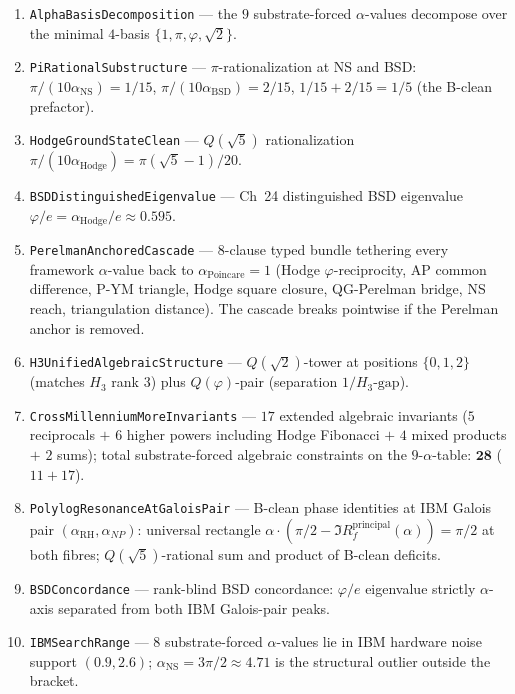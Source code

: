 \documentclass[11pt,a4paper]{article}
\theoremstyle{plain}
\theoremstyle{definition}
\theoremstyle{remark}
\newcommand{\aPo}{\alpha_{\mathrm{Poincare}}}
\newcommand{\aNP}{\alpha_{NP}}
\newcommand{\aRH}{\alpha_{\mathrm{RH}}}
\newcommand{\aNS}{\alpha_{\mathrm{NS}}}
\newcommand{\aBSD}{\alpha_{\mathrm{BSD}}}
\newcommand{\aHodge}{\alpha_{\mathrm{Hodge}}}
\newcommand{\code}[1]{\texttt{#1}}
\begin{document}
\begin{enumerate}[label=\textbf{S\arabic*}]
\item \code{AlphaBasisDecomposition} --- the $9$ substrate-forced
$\alpha$-values decompose over the minimal $4$-basis
$\{1, \pi, \varphi, \sqrt{2}\}$.

\item \code{PiRationalSubstructure} ---
$\pi$-rationalization at NS and BSD:
$\pi/(10 \aNS) = 1/15$, $\pi/(10 \aBSD) = 2/15$,
$1/15 + 2/15 = 1/5$ (the B-clean prefactor).

\item \code{HodgeGroundStateClean} ---
$Q(\sqrt{5})$ rationalization
$\pi/(10 \aHodge) = \pi(\sqrt{5}-1)/20$.

\item \code{BSDDistinguishedEigenvalue} --- Ch~24 distinguished
BSD eigenvalue $\varphi/e = \aHodge/e \approx 0.595$.

\item \code{PerelmanAnchoredCascade} --- $8$-clause typed
bundle tethering every framework $\alpha$-value back to
$\aPo = 1$ (Hodge $\varphi$-reciprocity, AP common difference,
P-YM triangle, Hodge square closure, QG-Perelman bridge, NS
reach, triangulation distance). The cascade breaks pointwise
if the Perelman anchor is removed.

\item \code{H3UnifiedAlgebraicStructure} ---
$Q(\sqrt{2})$-tower at positions $\{0, 1, 2\}$ (matches $H_{3}$
rank $3$) plus $Q(\varphi)$-pair (separation $1/H_{3}\text{-gap}$).

\item \code{CrossMillenniumMoreInvariants} --- $17$ extended
algebraic invariants ($5$ reciprocals $+$ $6$ higher powers
including Hodge Fibonacci $+$ $4$ mixed products $+$ $2$ sums);
total substrate-forced algebraic constraints on the $9$-$\alpha$-table:
$\boldsymbol{28}$ ($11 + 17$).

\item \code{PolylogResonanceAtGaloisPair} --- B-clean phase
identities at IBM Galois pair $(\aRH, \aNP)$: universal
rectangle $\alpha \cdot (\pi/2 - \Im R_{f}^{\mathrm{principal}}(\alpha)) = \pi/2$
at both fibres; $Q(\sqrt{5})$-rational sum and product of
B-clean deficits.

\item \code{BSDConcordance} --- rank-blind BSD concordance:
$\varphi/e$ eigenvalue strictly $\alpha$-axis separated from
both IBM Galois-pair peaks.

\item \code{IBMSearchRange} --- $8$ substrate-forced
$\alpha$-values lie in IBM hardware noise support $(0.9, 2.6)$;
$\aNS = 3\pi/2 \approx 4.71$ is the structural outlier outside
the bracket.
\end{enumerate}
\end{document}
